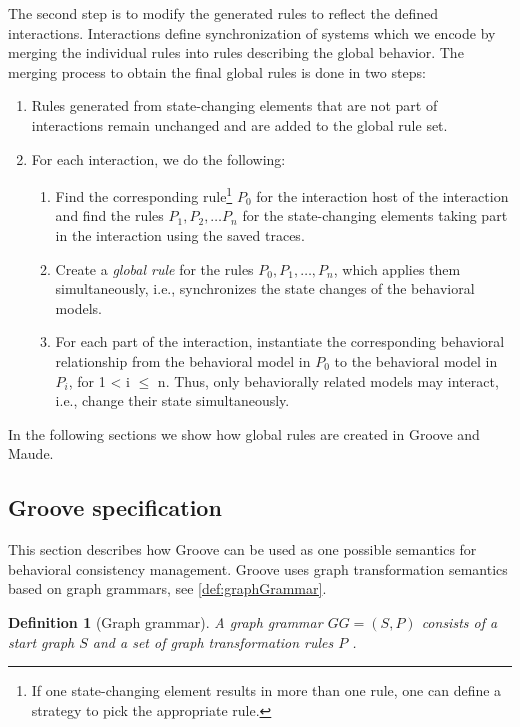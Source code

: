 \documentclass{jot}
\newtheorem{definition}{Definition}
\begin{document}
The second step is to modify the generated rules to reflect the defined interactions.
Interactions define synchronization of systems which we encode by merging the individual rules into rules describing the global behavior.
The merging process to obtain the final global rules is done in two steps:

\begin{enumerate}
    \item Rules generated from state-changing elements that are not part of interactions remain unchanged and are added to the global rule set.
    \item For each interaction, we do the following:
     \begin{enumerate}
         \item Find the corresponding rule\footnote{If one state-changing element results in more than one rule, one can define a strategy to pick the appropriate rule.} $P_0$ for the interaction host of the interaction and find the rules $P_1, P_2, \ldots P_n$ for the state-changing elements taking part in the interaction using the saved traces.
         \item Create a \textit{global rule} for the rules $P_0, P_1, \ldots, P_n$, which applies them simultaneously, i.e., synchronizes the state changes of the behavioral models.
         \item For each part of the interaction, instantiate the corresponding behavioral relationship from the behavioral model in $P_0$ to the behavioral model in $P_i$, for 1 < i $\leq$ n.
         Thus, only behaviorally related models may interact, i.e., change their state simultaneously.
     \end{enumerate}
\end{enumerate}

In the following sections we show how global rules are created in Groove and Maude.


\subsection{Groove specification} 
This section describes how Groove can be used as one possible semantics for behavioral consistency management.
Groove uses graph transformation semantics based on graph grammars, see \autoref{def:graphGrammar}.

\begin{definition}[Graph grammar] \label{def:graphGrammar}
A graph grammar $GG=(S, P)$ consists of a start graph $S$ and a set of graph transformation rules $P$ \cite{ehrigFundamentalsAlgebraicGraph2006}. 
\end{definition}
\end{document}
